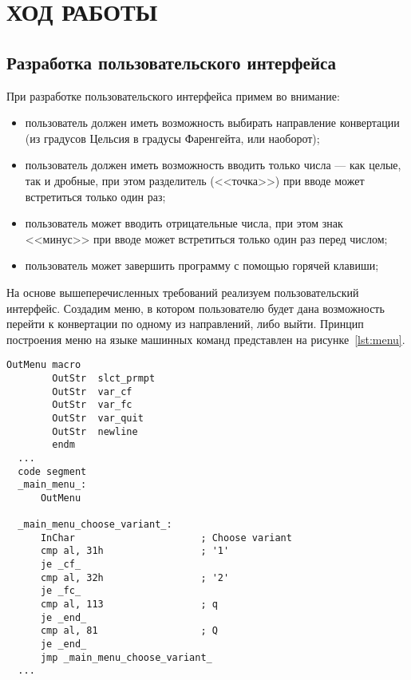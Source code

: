 \section{ХОД РАБОТЫ}

\subsection{Разработка пользовательского интерфейса}

При разработке пользовательского интерфейса примем во внимание:
\begin{itemize}

    \item пользователь должен иметь возможность выбирать направление
    конвертации (из градусов Цельсия в градусы Фаренгейта, или наоборот);

    \item пользователь должен иметь возможность вводить только числа --- как целые, так и дробные,
    при этом разделитель (<<точка>>) при вводе может встретиться только один раз;

    \item пользователь может вводить отрицательные числа, при этом знак <<минус>> при вводе
    может встретиться только один раз перед числом;

    \item пользователь может завершить программу с помощью горячей клавиши;

\end{itemize}

На основе вышеперечисленных требований реализуем пользовательский интерфейс.
Создадим меню, в котором пользователю будет дана возможность перейти к конвертации
по одному из направлений, либо выйти. Принцип построения меню на языке машинных
команд представлен на рисунке~\ref{lst:menu}.

\begin{lstlisting}[caption=Принцип построения пользователького меню на языке машинных команд,
label=lst:menu,language={[x86masm]Assembler},basicstyle=\scriptsize\ttfamily]
    OutMenu macro
        OutStr  slct_prmpt
        OutStr  var_cf
        OutStr  var_fc
        OutStr  var_quit
        OutStr  newline
        endm
  ...
  code segment
  _main_menu_:
      OutMenu

  _main_menu_choose_variant_:
      InChar                      ; Choose variant
      cmp al, 31h                 ; '1'
      je _cf_
      cmp al, 32h                 ; '2'
      je _fc_
      cmp al, 113                 ; q
      je _end_
      cmp al, 81                  ; Q
      je _end_
      jmp _main_menu_choose_variant_
  ...
\end{lstlisting}


